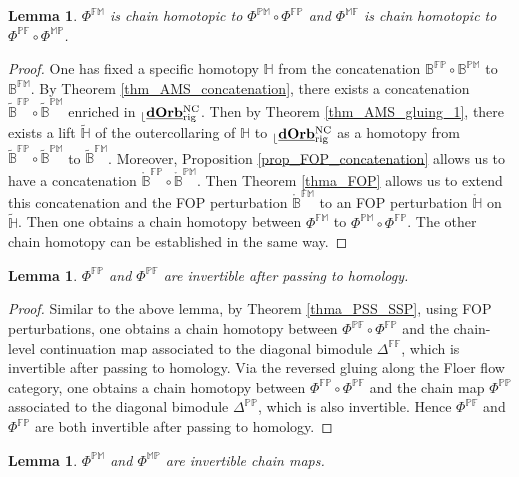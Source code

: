 \documentclass[reqno, 10pt]{amsart}
\numberwithin{equation}{section}
\numberwithin{equation}{section}
\newtheorem{lemma}[thm]{Lemma}
\theoremstyle{definition}
\theoremstyle{remark}
\newcommand{\mb}{\mathbb}
\renewcommand{\outer}{{}_{\lfloor}}
\newcommand{\uds}[1]{\underline{\smash{#1}}}
\begin{document}
\begin{lemma}\label{lemma139}
$\Phi^{\mb{FM}}$ is chain homotopic to $\Phi^{\mb{PM}} \circ \Phi^{\mb{FP}}$ and $\Phi^{\mb{MF}}$ is chain homotopic to $ \Phi^{\mb{PF}} \circ \Phi^{\mb{MP}}$.
\end{lemma}

\begin{proof}
One has fixed a specific homotopy $\mb{H}$ from the concatenation $\mb{B}^{\mb{FP}} \circ \mb{B}^{\mb{PM}}$ to $\mb{B}^{\mb{FM}}$. By Theorem \ref{thm_AMS_concatenation}, there exists a concatenation $\tilde{\mb{B}}^{\mb{FP}}\circ \tilde{\mb{B}}^{\mb{PM}}$ enriched in $\outer \uds{\bf dOrb}_{\rm rig}^{\rm NC}$. Then by Theorem \ref{thm_AMS_gluing_1}, there exists a lift $\tilde {\mb H}$ of the outercollaring of ${\mb H}$ to $\outer \uds{\bf dOrb}_{\rm rig}^{\rm NC}$ as a homotopy from $\tilde{\mb{B}}^{\mb{FP}}\circ \tilde{\mb{B}}^{\mb{PM}}$ to $\tilde {\mb B}^{\mb{FM}}$. Moreover, Proposition \ref{prop_FOP_concatenation} allows us to have a concatenation $\mathring{\mb{B}}^{\mb{FP}}\circ \mathring{\mb{B}}^{\mb{PM}}$. Then Theorem \ref{thma_FOP} allows us to extend this concatenation and the FOP perturbation $\mathring {\mb{B}}^{\mb{FM}}$ to an FOP perturbation $\mathring{\mb H}$ on $\tilde {\mb H}$. Then one obtains a chain homotopy between $\Phi^{\mb{FM}}$ to $\Phi^{\mb{PM}}\circ \Phi^{\mb{FP}}$. The other chain homotopy can be established in the same way. 
\end{proof}

\begin{lemma}
$\Phi^{\mb{FP}}$ and $\Phi^{\mb{PF}}$ are invertible after passing to homology.
\end{lemma}

\begin{proof}
Similar to the above lemma, by Theorem \ref{thma_PSS_SSP}, using FOP perturbations, one obtains a chain homotopy between $\Phi^{\mb{PF}} \circ \Phi^{\mb{FP}}$ and the chain-level continuation map associated to the diagonal bimodule $\mb{\Delta}^{\mb{FF}}$, which is invertible after passing to homology. Via the reversed gluing along the Floer flow category, one obtains a chain homotopy between $\Phi^{\mb{FP}} \circ \Phi^{\mb{PF}}$ and the chain map $\Phi^{\mb{PP}}$ associated to the diagonal bimodule $\mb{\Delta}^{\mb{PP}}$, which is also invertible. Hence $\Phi^{\mb{PF}}$ and $\Phi^{\mb{FP}}$ are both invertible after passing to homology.
\end{proof}

\begin{lemma}
$\Phi^{\mb{PM}}$ and $\Phi^{\mb{MP}}$ are invertible chain maps.
\end{lemma}
\end{document}
